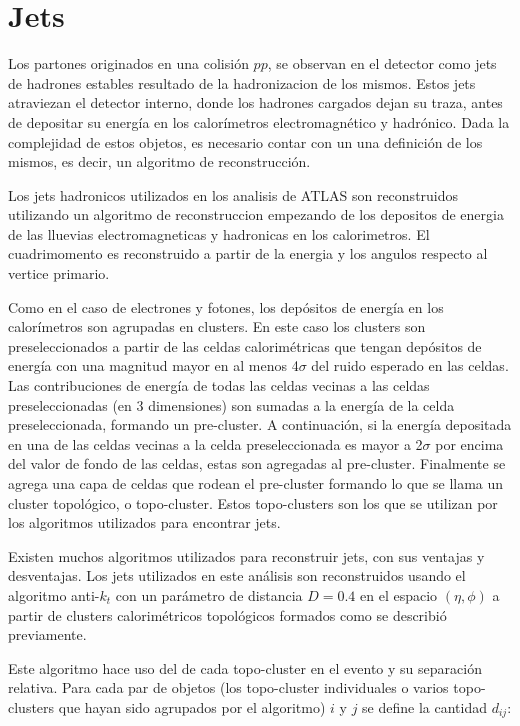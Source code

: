 \section{Jets}
\label{sec:jet_obj}

Los partones originados en una colisión $pp$, se observan en el detector como
jets de hadrones estables resultado de la hadronizacion de los mismos. Estos
jets atraviezan el detector interno, donde los hadrones cargados dejan su traza,
antes de depositar su energía en los calorímetros electromagnético y hadrónico.
Dada la complejidad de estos objetos, es necesario contar con un una definición
de los mismos, es decir, un algoritmo de reconstrucción.

Los jets hadronicos utilizados en los analisis de ATLAS son reconstruidos utilizando
un algoritmo de reconstruccion empezando de los depositos de energia de las lluevias
electromagneticas y hadronicas en los calorimetros. El cuadrimomento es reconstruido
a partir de la energia y los angulos respecto al vertice primario.

Como en el caso de electrones y fotones, los depósitos de energía en los
calorímetros son agrupadas en clusters. En este caso los clusters son
preseleccionados a partir de las celdas calorimétricas que tengan depósitos de
energía con una magnitud mayor en al menos 4$\sigma$ del ruido esperado en las
celdas. Las contribuciones de energía de todas las celdas vecinas a las celdas
preseleccionadas (en 3 dimensiones) son sumadas a la energía de la celda
preseleccionada, formando un pre-cluster. A continuación, si la energía
depositada en una de las celdas vecinas a la celda preseleccionada es mayor a
2$\sigma$ por encima del valor de fondo de las celdas, estas son agregadas al
pre-cluster. Finalmente se agrega una capa de celdas que rodean el pre-cluster
formando lo que se llama un cluster topológico, o topo-cluster.
Estos topo-clusters son los que se utilizan por los algoritmos
utilizados para encontrar jets.

Existen muchos algoritmos utilizados para reconstruir jets, con sus ventajas y
desventajas. Los jets utilizados en este análisis son reconstruidos usando el
algoritmo anti-$k_t$\cite{Cacciari:2008gp} con un parámetro de distancia $D =
0.4$ en el espacio $(\eta, \phi)$ a partir de clusters calorimétricos
topológicos\cite{Lampl:1099735} formados como se describió previamente.

Este algoritmo hace uso del {\pt} de cada topo-cluster en el evento y su
separación relativa. Para cada par de objetos (los topo-cluster individuales o
varios topo-clusters que hayan sido agrupados por el algoritmo) $i$ y $j$ se
define la cantidad $d_{ij}$:

